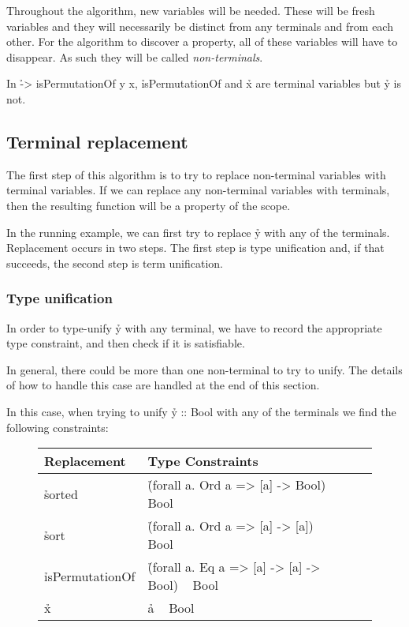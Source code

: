 \documentclass[a4paper, 11pt, onepage]{article}
\begin{document}
Throughout the algorithm, new variables will be needed.
These will be fresh variables and they will necessarily be distinct from any terminals and from each other.
For the algorithm to discover a property, all of these variables will have to disappear.
As such they will be called \emph{non-terminals}.

\begin{ex}
  In \h{\x -> isPermutationOf y x}, \h{isPermutationOf} and \h{x} are terminal variables but \h{y} is not.
\end{ex}


\subsection{Terminal replacement}

The first step of this algorithm is to try to replace non-terminal variables with terminal variables.
If we can replace any non-terminal variables with terminals, then the resulting function will be a property of the scope.

In the running example, we can first try to replace \h{y} with any of the terminals.
Replacement occurs in two steps.
The first step is type unification and, if that succeeds, the second step is term unification.


\subsubsection{Type unification}

In order to type-unify \h{y} with any terminal, we have to record the appropriate type constraint, and then check if it is satisfiable.

In general, there could be more than one non-terminal to try to unify.
The details of how to handle this case are handled at the end of this section.

In this case, when trying to unify \h{y :: Bool} with any of the terminals we find the following constraints:

\begin{figure}[H]
  \centering
  \begin{tabular}{|l|l|l|}
    \hline
    Replacement & Type Constraints \\
    \hline
    \hline
    \h{sorted} & \h{(forall a. Ord a => [a] -> Bool) ~ Bool} \\
    \hline
    \h{sort} & \h{(forall a. Ord a => [a] -> [a]) ~ Bool} \\
    \hline
    \h{isPermutationOf} & \h{(forall a. Eq a => [a] -> [a] -> Bool) ~ Bool} \\
    \hline
    \h{x} & \h{a ~ Bool} \\
    \hline
  \end{tabular}
\end{figure}
\end{document}
